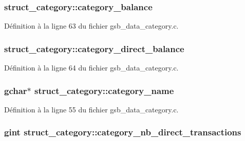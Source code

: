 \subsubsection[{category\_\-balance}]{ {\bf struct\_\-category::category\_\-balance}}\label{structstruct__category_adec05e2e6d34e2f1ac7003953d1bfcfd}


Définition à la ligne 63 du fichier gsb\_\-data\_\-category.c.

\subsubsection[{category\_\-direct\_\-balance}]{ {\bf struct\_\-category::category\_\-direct\_\-balance}}\label{structstruct__category_ab953e42bcd7d28744d3d572fd0af50d3}


Définition à la ligne 64 du fichier gsb\_\-data\_\-category.c.

\subsubsection[{category\_\-name}]{\setlength{\rightskip}{0pt plus 5cm}gchar$\ast$ {\bf struct\_\-category::category\_\-name}}\label{structstruct__category_a3d434228703dd500c7378db4c2ddea5c}


Définition à la ligne 55 du fichier gsb\_\-data\_\-category.c.

\subsubsection[{category\_\-nb\_\-direct\_\-transactions}]{\setlength{\rightskip}{0pt plus 5cm}gint {\bf struct\_\-category::category\_\-nb\_\-direct\_\-transactions}}\label{structstruct__category_a4e4175a073964c1c555879a821a58bc6}


